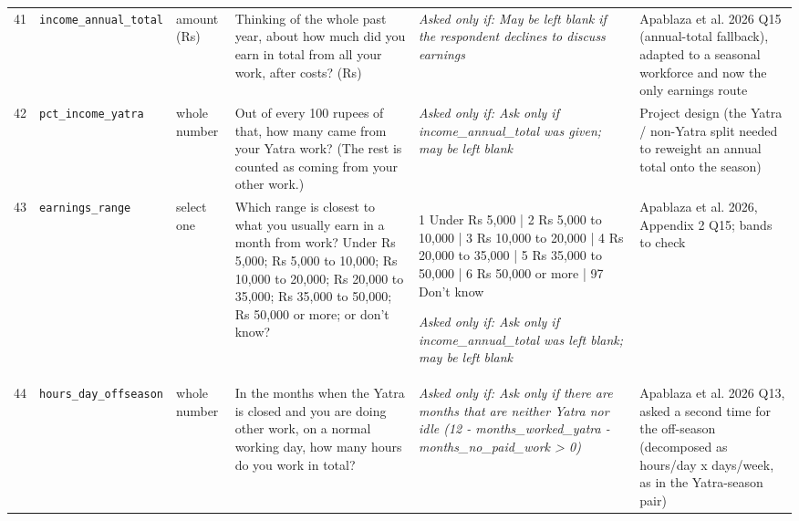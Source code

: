 \documentclass[9pt,a4paper,landscape]{article}
\begin{document}
\begin{longtable}{@{}p{0.5cm}p{3.3cm}p{1.7cm}p{7.3cm}p{5.6cm}p{5.4cm}@{}}
\footnotesize 41 & \footnotesize\texttt{income\_annual\_total} & \scriptsize amount (Rs) & \footnotesize Thinking of the whole past year, about how much did you earn in total from all your work, after costs? (Rs)\par\vspace{1pt}{\footnotesize\color{hdr}{\hifont पूरे पिछले साल को मिलाकर, सारे काम से ख़र्चा निकालकर आपने कुल कितना कमाया? (रुपये)}} & \scriptsize \textit{Asked only if: May be left blank if the respondent declines to discuss earnings} & \scriptsize Apablaza et al. 2026 Q15 (annual-total fallback), adapted to a seasonal workforce and now the only earnings route\\
\footnotesize 42 & \footnotesize\texttt{pct\_income\_yatra} & \scriptsize whole number & \footnotesize Out of every 100 rupees of that, how many came from your Yatra work? (The rest is counted as coming from your other work.)\par\vspace{1pt}{\footnotesize\color{hdr}{\hifont पूरे साल में आपने जो 100 रुपये कमाए, उनमें से कितने यात्रा के काम से आए? (बाकी दूसरे काम का माना जाएगा।)}} & \scriptsize \textit{Asked only if: Ask only if income\_annual\_total was given; may be left blank} & \scriptsize Project design (the Yatra / non-Yatra split needed to reweight an annual total onto the season)\\
\footnotesize 43 & \footnotesize\texttt{earnings\_range} & \scriptsize select one & \footnotesize Which range is closest to what you usually earn in a month from work? Under Rs 5,000; Rs 5,000 to 10,000; Rs 10,000 to 20,000; Rs 20,000 to 35,000; Rs 35,000 to 50,000; Rs 50,000 or more; or don't know?\par\vspace{1pt}{\footnotesize\color{hdr}{\hifont आपकी एक महीने की कमाई लगभग किस दायरे में है? 5,000 रुपये से कम; 5,000 से 10,000; 10,000 से 20,000; 20,000 से 35,000; 35,000 से 50,000; 50,000 या उससे ज़्यादा; या पता नहीं?}} & \scriptsize 1 Under Rs 5,000 | 2 Rs 5,000 to 10,000 | 3 Rs 10,000 to 20,000 | 4 Rs 20,000 to 35,000 | 5 Rs 35,000 to 50,000 | 6 Rs 50,000 or more | 97 Don't know\par\vspace{1pt}\textit{Asked only if: Ask only if income\_annual\_total was left blank; may be left blank} & \scriptsize Apablaza et al. 2026, Appendix 2 Q15; bands to check\\
\footnotesize 44 & \footnotesize\texttt{hours\_day\_offseason} & \scriptsize whole number & \footnotesize In the months when the Yatra is closed and you are doing other work, on a normal working day, how many hours do you work in total?\par\vspace{1pt}{\footnotesize\color{hdr}{\hifont जिन महीनों में यात्रा बंद रहती है और आप कोई दूसरा काम करते हैं, उनमें आम दिन में आप कुल कितने घंटे काम करते हैं?}} & \scriptsize \textit{Asked only if: Ask only if there are months that are neither Yatra nor idle (12 - months\_worked\_yatra - months\_no\_paid\_work > 0)} & \scriptsize Apablaza et al. 2026 Q13, asked a second time for the off-season (decomposed as hours/day x days/week, as in the Yatra-season pair)\\

\end{longtable}
\end{document}
